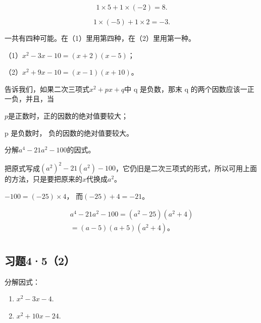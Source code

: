 \[
1 \times 5 + 1 \times (- 2) = 8.
\]

\[
1 \times (- 5) + 1 \times 2 = - 3.
\]

一共有四种可能。在（1）里用第四种，在（2）里用第一种。

 （1）\(x^{2} - 3x - 10 = (x + 2)(x - 5)\)；

（2）\(x^{2} + 9x - 10 = (x - 1)(x + 10)\)。

 告诉我们，如果二次三项式\(x^{2}+px+q\)中 q 是负数，那末 q
的两个因数应该一正一负，并且，当

\(p\)是正数时，正的因数的绝对值要较大；

p 是负数时， 负的因数的绝对值要较大。

 分解\(a^{4}-21a^{2}-100\)的因式。

把原式写成\((a^2)^2 - 21(a^2) - 100\)，它仍旧是二次三项式的形式，所以可用上面的方法，只是要把原来的\(x\)代换成\(a^2\)。

\(-100 = (-25) \times 4\)， 而\((-25) + 4 = -21\)。

\[
\begin{array}{l} a ^{4} - 21 a ^{2} - 100 = (a ^{2} - 25) (a ^{2} + 4) \\ = (a - 5) (a + 5) (a ^{2} + 4)\text{。} \\ \end{array}
\]

\subsection{习题4·5（2）}

分解因式：

\begin{enumerate}[start=1]
\item
  \(x^{2} - 3x - 4.\)
\item
  \(x^{2} + 10x - 24.\)
\end{enumerate}

